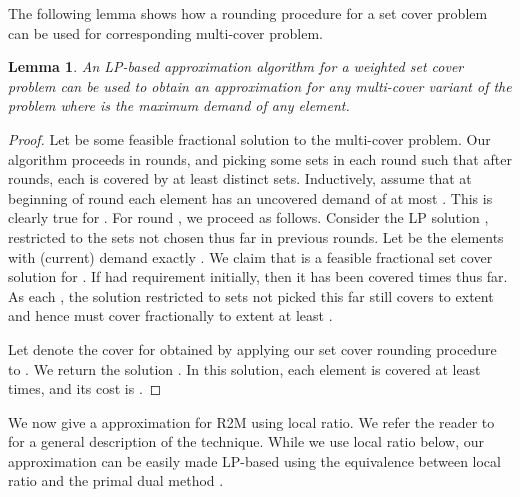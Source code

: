 \documentclass[11pt]{article}
\newtheorem{lemma}[thm]{Lemma}
\begin{document}
The following lemma shows how a rounding procedure for a set cover problem can be used for corresponding  multi-cover problem.
 
\begin{lemma}
\label{setmult}
An LP-based  approximation algorithm for a weighted set cover problem can be used to obtain an  approximation for any multi-cover variant of the problem where  is the maximum demand of any element. 
\end{lemma}
\begin{proof}
Let  be some feasible fractional solution to the multi-cover problem. Our algorithm proceeds in  rounds, and picking 
some sets in each round such that after  rounds, each  is covered by at least  distinct sets. 
Inductively, assume
that at beginning of round  each element has an uncovered demand of at most .
This is clearly true for .
For round , we proceed as follows. 
Consider the LP solution , restricted to the sets not chosen thus far in previous rounds.
Let  be the elements with (current) demand exactly .
We claim that  is a feasible fractional set cover solution for .
If  had requirement  initially, then it has been covered  times thus far. As each , the solution  restricted to sets not picked this far still covers  to extent  and hence  must cover  fractionally to extent at least . 

Let  denote the cover for  obtained by applying our set cover rounding procedure to .
We return the solution . In this solution, each element  is covered at least  times, and its cost is . 
\end{proof}


We now give a  approximation for R2M using local ratio. We refer the reader to \cite{BBF} for a general description of the technique. While we use local ratio below, our approximation can be easily made LP-based
using the equivalence between local ratio and the primal dual method \cite{BR}.
\end{document}
